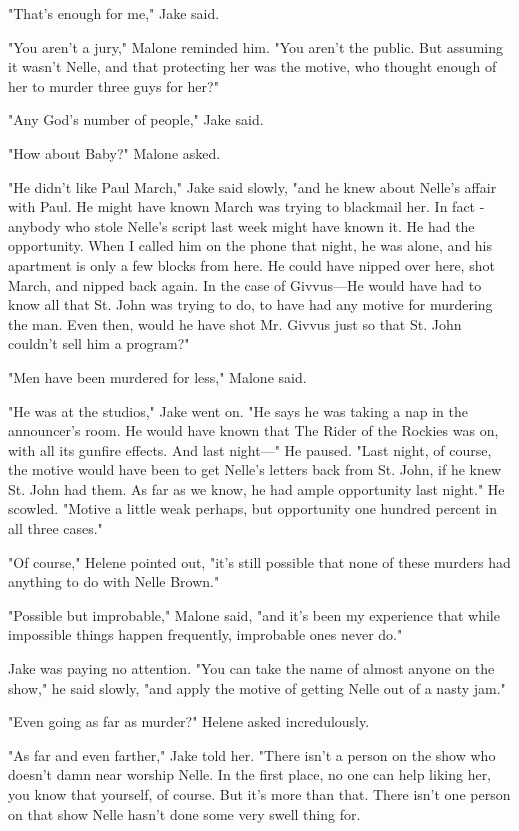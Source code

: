 \documentclass{novel}
\begin{document}
"That's enough for me," Jake said.

"You aren't a jury," Malone reminded him. "You aren't the public. But assuming it wasn't Nelle, and that protecting her was the motive, who thought enough of her to murder three guys for her?"

"Any God's number of people," Jake said.

"How about Baby?" Malone asked.

"He didn't like Paul March," Jake said slowly, "and he knew about Nelle's affair with Paul. He might have known March was trying to blackmail her. In fact - anybody who stole Nelle's script last week might have known it. He had the opportunity. When I called him on the phone that night, he was alone, and his apartment is only a few blocks from here. He could have nipped over here, shot March, and nipped back again. In the case of Givvus—He would have had to know all that St. John was trying to do, to have had any motive for murdering the man. Even then, would he have shot Mr. Givvus just so that St. John couldn't sell him a program?"

"Men have been murdered for less," Malone said.

"He was at the studios," Jake went on. "He says he was taking a nap in the announcer's room. He would have known that The Rider of the Rockies was on, with all its gunfire effects. And last night—" He paused. "Last night, of course, the motive would have been to get Nelle's letters back from St. John, if he knew St. John had them. As far as we know, he had ample opportunity last night." He scowled. "Motive a little weak perhaps, but opportunity one hundred percent in all three cases."

"Of course," Helene pointed out, "it's still possible that none of these murders had anything to do with Nelle Brown."

"Possible but improbable," Malone said, "and it's been my experience that while impossible things happen frequently, improbable ones never do."

Jake was paying no attention. "You can take the name of almost anyone on the show," he said slowly, "and apply the motive of getting Nelle out of a nasty jam."

"Even going as far as murder?" Helene asked incredulously.

"As far and even farther," Jake told her. "There isn't a person on the show who doesn't damn near worship Nelle. In the first place, no one can help liking her, you know that yourself, of course. But it's more than that. There isn't one person on that show Nelle hasn't done some very swell thing for.
\end{document}
